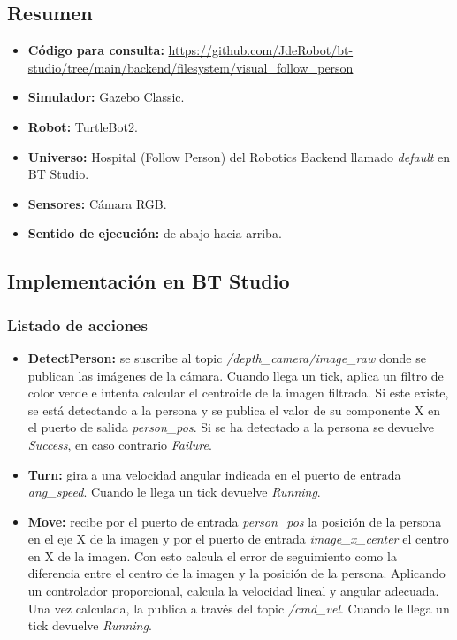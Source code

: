 \subsection{Resumen}

\begin{itemize}
    \item \textbf{Código para consulta:} \url{https://github.com/JdeRobot/bt-studio/tree/main/backend/filesystem/visual_follow_person}
    \item \textbf{Simulador:} Gazebo Classic.
    \item \textbf{Robot:} TurtleBot2.
    \item \textbf{Universo:} Hospital (Follow Person) del Robotics Backend llamado \textit{default} en BT Studio.
    \item \textbf{Sensores:} Cámara RGB.
    \item \textbf{Sentido de ejecución:} de abajo hacia arriba. 
\end{itemize}

\subsection{Implementación en BT Studio}

\subsubsection{Listado de acciones}
\begin{itemize}
    \item \textbf{DetectPerson:} se suscribe al topic \textit{/depth\_camera/image\_raw} donde se publican las imágenes de la cámara. Cuando llega un tick, aplica un filtro de color verde e intenta calcular el centroide de la imagen filtrada. Si este existe, se está detectando a la persona y se publica el valor de su componente X en el puerto de salida \textit{person\_pos}. Si se ha detectado a la persona se devuelve \textit{Success}, en caso contrario \textit{Failure}. 
    \item \textbf{Turn:} gira a una velocidad angular indicada en el puerto de entrada \textit{ang\_speed}. Cuando le llega un tick devuelve \textit{Running}. 
    \item \textbf{Move:} recibe por el puerto de entrada \textit{person\_pos} la posición de la persona en el eje X de la imagen y por el puerto de entrada \textit{image\_x\_center} el centro en X de la imagen. Con esto calcula el error de seguimiento como la diferencia entre el centro de la imagen y la posición de la persona. Aplicando un controlador proporcional, calcula la velocidad lineal y angular adecuada. Una vez calculada, la publica a través del topic \textit{/cmd\_vel}. Cuando le llega un tick devuelve \textit{Running}. 
\end{itemize}

